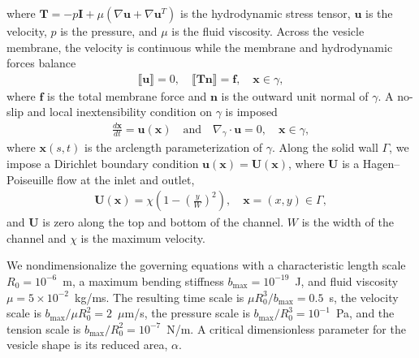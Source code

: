 \documentclass[twoside,twocolumn,9pt]{article}
\newcommand{\ff}{\mathbf{f}}
\newcommand{\nn}{\mathbf{n}}
\newcommand{\uu}{\mathbf{u}}
\newcommand{\TT}{\mathbf{T}}
\newcommand{\UU}{\mathbf{U}}
\newcommand{\xx}{\mathbf{x}}
\begin{document}
where $\TT = -p\mathbf{I} + \mu\left(\nabla \uu + \nabla \uu^T \right)$ is the hydrodynamic stress tensor, $\uu$ is the velocity, $p$ is the pressure, and $\mu$ is the fluid viscosity. Across the vesicle membrane, the velocity is continuous while the membrane and hydrodynamic forces balance
\begin{align}
    \llbracket \uu \rrbracket = 0, \quad \llbracket \TT\nn \rrbracket = \ff, \quad \xx \in \gamma,
\end{align}
where $\ff$ is the total membrane force and $\nn$ is the outward unit normal of $\gamma$. A no-slip and local inextensibility condition on $\gamma$ is imposed
\begin{align}
    \frac{d\xx}{dt} = \uu(\xx) \quad \text{and} \quad \nabla_{\gamma} \cdot \uu = 0,
    \quad \xx \in \gamma,
\end{align}
where $\xx(s,t)$ is the arclength parameterization of $\gamma$. Along the solid wall $\Gamma$, we impose a Dirichlet boundary condition $\uu(\xx) = \UU(\xx)$, where $\UU$ is a Hagen–Poiseuille flow at the inlet and outlet,
\begin{align}
    \UU(\xx) = \chi \left(1 - \left(\frac{y}{W}\right)^2 \right), \quad \xx = (x,y) \in \Gamma,
\end{align}
and $\UU$ is zero along the top and bottom of the channel. $W$ is the width of the channel and $\chi$ is the maximum velocity. 

We nondimensionalize the governing equations with a characteristic length scale $R_0 = 10^{-6}$~m, a maximum bending stiffness $b_{\max} = 10^{-19}$~J, and fluid viscosity $\mu = 5 \times 10^{-2}$~kg/ms. The resulting time scale is $\mu R_0^3/b_{\max} = 0.5$~s, the velocity scale is $b_{\max}/\mu R_0^2=2$~$\mu$m/s, the pressure scale is $b_{\max}/R_0^3 = 10^{-1}$~Pa, and the tension scale is $b_{\max}/R_0^2 = 10^{-7}$~N/m. A critical dimensionless parameter for the vesicle shape is its reduced area, $\alpha$.

\end{document}
